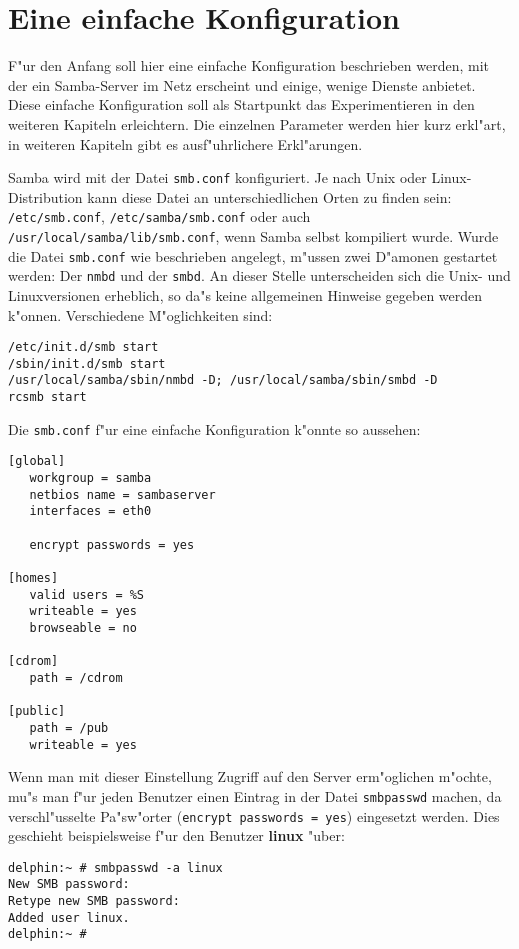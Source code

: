 \documentclass{scrartcl}\usepackage{pslatex}\typearea{12}
\newcommand{\prog}{\texttt}
\newcommand{\param}{\texttt}
\newcommand{\dateistyle}{\texttt}
\newcommand{\username}{\textbf}
\begin{document}
\section{Eine einfache Konfiguration}

F"ur den Anfang soll hier eine einfache Konfiguration beschrieben
werden, mit der ein Samba-Server im Netz erscheint und einige, wenige
Dienste anbietet. Diese einfache Konfiguration soll als Startpunkt das
Experimentieren in den weiteren Kapiteln erleichtern. Die einzelnen
Parameter werden hier kurz erkl"art, in weiteren Kapiteln gibt es
ausf"uhrlichere Erkl"arungen.

Samba wird mit der Datei \prog{smb.conf} konfiguriert. Je nach Unix
oder Linux-Distribution kann diese Datei an unterschiedlichen Orten zu
finden sein: \prog{/etc/smb.conf}, \prog{/etc/samba/smb.conf} oder
auch \prog{/usr/local/samba/lib/smb.conf}, wenn Samba selbst
kompiliert wurde. Wurde die Datei \prog{smb.conf} wie beschrieben
angelegt, m"ussen zwei D"amonen gestartet werden: Der \prog{nmbd} und
der \prog{smbd}. An dieser Stelle unterscheiden sich die Unix- und
Linuxversionen erheblich, so da"s keine allgemeinen Hinweise gegeben
werden k"onnen. Verschiedene M"oglichkeiten sind:

\begin{verbatim}
/etc/init.d/smb start
/sbin/init.d/smb start
/usr/local/samba/sbin/nmbd -D; /usr/local/samba/sbin/smbd -D
rcsmb start
\end{verbatim}

Die \prog{smb.conf} f"ur eine einfache Konfiguration k"onnte so
aussehen:

\begin{verbatim}
[global]
   workgroup = samba
   netbios name = sambaserver
   interfaces = eth0

   encrypt passwords = yes

[homes]
   valid users = %S
   writeable = yes
   browseable = no

[cdrom]
   path = /cdrom

[public]
   path = /pub
   writeable = yes
\end{verbatim}

Wenn man mit dieser Einstellung Zugriff auf den Server erm"oglichen
m"ochte, mu"s man f"ur jeden Benutzer einen Eintrag in der Datei
\dateistyle{smbpasswd} machen, da verschl"usselte Pa"sw"orter
(\param{encrypt passwords = yes}) eingesetzt werden. Dies geschieht
beispielsweise f"ur den Benutzer \username{linux} "uber:

\begin{verbatim}
delphin:~ # smbpasswd -a linux
New SMB password:
Retype new SMB password:
Added user linux.
delphin:~ #
\end{verbatim}
\end{document}
